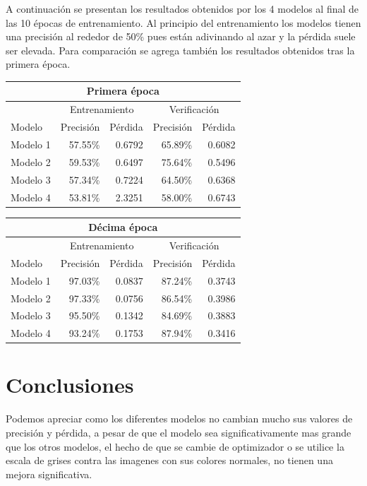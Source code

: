 \documentclass[spanish,11pt,letterpaper]{article}
\begin{document}
A continuación se presentan los resultados obtenidos por los 4 modelos al final
de las 10 épocas de entrenamiento. Al principio del entrenamiento los modelos
tienen una precisión al rededor de 50\% pues están adivinando al azar y la pérdida
suele ser elevada. Para comparación se agrega también los resultados obtenidos
tras la primera época.

\begin{center}
\begin{tabular}{|l||r|r|r|r|}
\hline
\multicolumn{5}{|c|}{Primera época}
\\ \hline
& \multicolumn{2}{|c|}{Entrenamiento} & \multicolumn{2}{|c|}{Verificación}
\\ \hline
Modelo & Precisión & Pérdida & Precisión & Pérdida
\\ \hline
Modelo 1 & 57.55\% & 0.6792 & 65.89\% & 0.6082\\
Modelo 2 & 59.53\% & 0.6497 & 75.64\% & 0.5496\\
Modelo 3 & 57.34\% & 0.7224 & 64.50\% & 0.6368\\
Modelo 4 & 53.81\% & 2.3251 & 58.00\% & 0.6743\\
\hline
\end{tabular}
\end{center}

\begin{center}
\begin{tabular}{|l||r|r|r|r|}
\hline
\multicolumn{5}{|c|}{Décima época}
\\ \hline
& \multicolumn{2}{|c|}{Entrenamiento} & \multicolumn{2}{|c|}{Verificación}
\\ \hline
Modelo & Precisión & Pérdida & Precisión & Pérdida
\\ \hline
Modelo 1 & 97.03\% & 0.0837 & 87.24\% & 0.3743\\
Modelo 2 & 97.33\% & 0.0756 & 86.54\% & 0.3986\\
Modelo 3 & 95.50\% & 0.1342 & 84.69\% & 0.3883\\
Modelo 4 & 93.24\% & 0.1753 & 87.94\% & 0.3416\\
\hline
\end{tabular}
\end{center}

\section{Conclusiones}

Podemos apreciar como los diferentes modelos no cambian mucho sus valores de precisión y pérdida, a pesar
de que el modelo sea significativamente mas grande que los otros modelos, el hecho de que se cambie de
optimizador o se utilice la escala de grises contra las imagenes con sus colores normales, no tienen una mejora
significativa.
\end{document}
